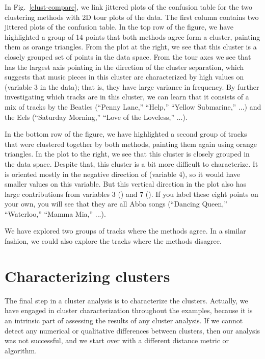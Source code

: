 
In Fig.~\ref{clust-compare}, we link jittered plots of the confusion
table for the two clustering methods with 2D tour plots of the
data. The first column contains two jittered plots of the confusion
table.  In the top row of the figure, we have highlighted a group of
14 points that both methods agree form a cluster, painting them as
orange triangles. From the plot at the right, we see that this cluster
is a closely grouped set of points in the data space. From the tour
axes we see that  has the largest axis pointing in the
direction of the cluster separation, which suggests that music pieces
in this cluster are characterized by high values on 
(variable 3 in the data); that is, they have large variance in
frequency. By further investigating which tracks are in this cluster,
we can learn that it consists of a mix of tracks by the Beatles
(``Penny Lane,'' ``Help,'' ``Yellow Submarine,'' ...)  and the Eels
(``Saturday Morning,'' ``Love of the Loveless,'' ...).

In the bottom row of the figure, we have highlighted a second group of
tracks that were clustered together by both methods, painting them
again using orange triangles.  In the plot to the right, we see that
this cluster is closely grouped in the data space.  Despite that, this
cluster is a bit more difficult to characterize.  It is oriented
mostly in the negative direction of  (variable 4), so it would
have smaller values on this variable. But this vertical direction in
the plot also has large contributions from variables 3 () and 7
().  If you label these eight points on your own, you will see
that they are all Abba songs (``Dancing Queen,'' ``Waterloo,'' ``Mamma
Mia,'' ...).

We have explored two groups of tracks where the methods agree. In a
similar fashion, we could also explore the tracks where the methods
disagree.

\section{Characterizing clusters}

The final step in a cluster analysis is to characterize the clusters.
Actually, we have engaged in cluster characterization throughout the
examples, because it is an intrinsic part of assessing the results of
any cluster analysis.  If we cannot detect any numerical or qualitative
differences between clusters, then our analysis was not successful,
and we start over with a different distance metric or algorithm.

